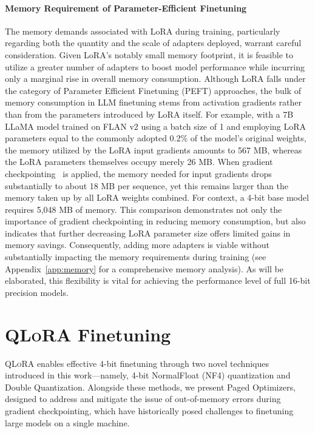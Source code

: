 \paragraph{Memory Requirement of Parameter-Efficient Finetuning} The memory demands associated with LoRA during training, particularly regarding both the quantity and the scale of adapters deployed, warrant careful consideration. Given LoRA's notably small memory footprint, it is feasible to utilize a greater number of adapters to boost model performance while incurring only a marginal rise in overall memory consumption. Although LoRA falls under the category of Parameter Efficient Finetuning (PEFT) approaches, the bulk of memory consumption in LLM finetuning stems from activation gradients rather than from the parameters introduced by LoRA itself. For example, with a 7B LLaMA model trained on FLAN v2 using a batch size of 1 and employing LoRA parameters equal to the commonly adopted 0.2\% of the model's original weights\citep{hu2021lora,liu2022few}, the memory utilized by the LoRA input gradients amounts to 567 MB, whereas the LoRA parameters themselves occupy merely 26 MB. When gradient checkpointing~\citep{chen2016training} is applied, the memory needed for input gradients drops substantially to about 18 MB per sequence, yet this remains larger than the memory taken up by all LoRA weights combined. For context, a 4-bit base model requires 5,048 MB of memory. This comparison demonstrates not only the importance of gradient checkpointing in reducing memory consumption, but also indicates that further decreasing LoRA parameter size offers limited gains in memory savings. Consequently, adding more adapters is viable without substantially impacting the memory requirements during training (see Appendix~\ref{app:memory} for a comprehensive memory analysis). As will be elaborated, this flexibility is vital for achieving the performance level of full 16-bit precision models.

\section{\textsc{QLoRA} Finetuning}

\textsc{QLoRA} enables effective 4-bit finetuning through two novel techniques introduced in this work—namely, 4-bit NormalFloat (NF4) quantization and Double Quantization. Alongside these methods, we present Paged Optimizers, designed to address and mitigate the issue of out-of-memory errors during gradient checkpointing, which have historically posed challenges to finetuning large models on a single machine.

